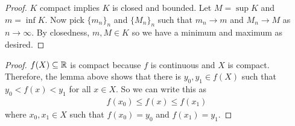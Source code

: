 \documentclass{report}
\begin{document}
\begin{proof}
    $K$ compact implies $K$ is closed and bounded. Let $M = \sup K$ and $m = \inf K$. Now pick $\{m_n\}_{n}$ and $\{M_n\}_{n}$ such that $m_n \to m$ and $M_n \to M$ as $n \to \infty$. By closedness, $m, M \in K$ so we have a minimum and maximum as desired.
\end{proof}
\begin{proof}
    $f(X) \subseteq \RR$ is compact because $f$ is continuous and $X$ is compact. Therefore, the lemma above shows that there is $y_0, y_1 \in f(X)$ such that $y_0 < f(x) < y_1$ for all $x \in X$. So we can write this as 
    \begin{align*}
        f(x_0) \leq f(x) \leq f(x_1)
    \end{align*}
    where $x_0, x_1 \in X$ such that $f(x_0) = y_0$ and $f(x_1) = y_1$.
\end{proof}
\end{document}
